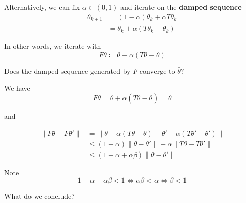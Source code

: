 \documentclass[xcolor=dvipsnames]{beamer}  %
\renewcommand{\leq}{\leqslant}
\newcommand{\emp}[1]{\textcolor{DarkOrange1}{\bf #1}}
\newcommand{\1}{\mathbbm 1}
\begin{document}
\begin{frame}
    
    Alternatively, we can
    fix $\alpha \in (0,1)$ and
    iterate on the \emp{damped sequence}
    \begin{align*}
        \theta_{k+1} 
        & = (1-\alpha) \theta_k + \alpha T \theta_k
        \\
        & =  \theta_k + \alpha (T \theta_k - \theta_k)
    \end{align*}

    In other words, we iterate with
    \begin{equation*}
        F\theta \coloneq \theta + \alpha (T\theta - \theta)
    \end{equation*}


\end{frame}




\begin{frame}

    Does the damped sequence generated by $F$ converge to $\bar \theta$?

    \vspace{0.5em}
    We have
    \begin{equation*}
        F \bar \theta 
        = \bar \theta + \alpha (T \bar \theta - \bar \theta)
        = \bar \theta
    \end{equation*}

    \vspace{0.5em}
    and

    \begin{align*}
        \| F\theta - F\theta'\|
        & = \| 
            \theta + \alpha (T\theta - \theta)
            - \theta' - \alpha (T\theta' - \theta')
        \|
        \\
        & \leq (1-\alpha)\|\theta - \theta'\| + \alpha \| T\theta - T\theta'\|
        \\
        & \leq (1-\alpha + \alpha \beta)\| \theta - \theta'\|
    \end{align*}

    Note 
    \begin{equation*}
        1-\alpha + \alpha \beta < 1
        \iff \alpha \beta < \alpha
        \iff \beta < 1
    \end{equation*}
    
\end{frame}


\begin{frame}
    
    What do we conclude?
\end{frame}
\end{document}
